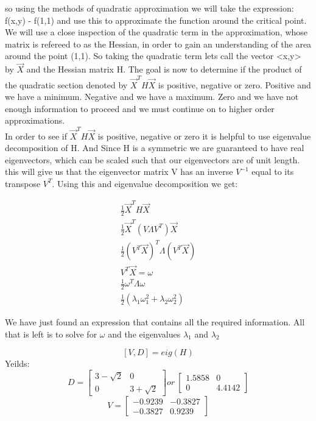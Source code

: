 \documentclass[12pt]{article}
\begin{document}
so using the methods of quadratic approximation we will take the expression: f(x,y) - f(1,1) and use this to approximate the function around the critical point. We will use a close inspection of the quadratic term in the approximation, whose matrix is refereed to as the Hessian, in order to gain an understanding of the area around the point (1,1). So taking the quadratic term lets call the vector <x,y> by $\vec{X}$ and the Hessian matrix H. The goal is now to determine if the product of the quadratic section denoted by $\vec{X}^{T}H\vec{X}$ is positive, negative or zero. Positive and we have a minimum. Negative and we have a maximum. Zero and we have not enough information to proceed and we must continue on to higher order approximations.\\

In order to see if  $\vec{X}^{T}H\vec{X}$ is positive, negative or zero it is helpful to use eigenvalue decomposition of H. And Since H is a symmetric we are guaranteed to have real eigenvectors, which can be scaled such that our eigenvectors are of unit length. this will give us that the eigenvector matrix V has an inverse $V^{-1}$ equal to its transpose $V^{T}$. Using this and eigenvalue decomposition we get:

\begin{eqnarray}
\frac{1}{2} \vec{X}^{T}H\vec{X}\\
\frac{1}{2} \vec{X}^{T}(V \Lambda V^{T})\vec{X}\\
\frac{1}{2} (V^{T}\vec{X})^{T} \Lambda (V^{T}\vec{X})\\
V^{T}\vec{X} = \omega\\
\frac{1}{2} \omega^{T} \Lambda \omega\\
\frac{1}{2}( \lambda_{1} \omega_{1}^{2} + \lambda_{2} \omega_{2}^{2} )
\end{eqnarray}

We have just found an expression that contains all the required information. All that is left is to solve for $\omega$ and the eigenvalues $\lambda_1$ and $\lambda_2$

\[
[V,D] = eig(H)
\]
Yeilds:
\[
D = 
\begin{bmatrix}
3-\sqrt{2} & 0\\
0 & 3 + \sqrt{2}
\end{bmatrix}
or\ 
\begin{bmatrix}
1.5858 & 0\\
0 & 4.4142
\end{bmatrix}
\]
\[
V = 
\begin{bmatrix}
 -0.9239 &  -0.3827\\
   -0.3827  &  0.9239
\end{bmatrix}
\]
\end{document}
